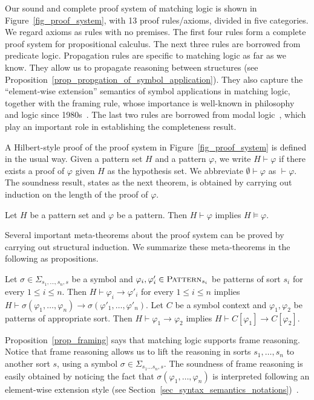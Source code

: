 \documentclass[acmsmall,review,anonymous]{acmart}
\newcommand{\imp}{\to}
\newcommand{\Pattern}{\textnormal{\textsc{Pattern}}}
\newcommand{\ddd}{,\dots,}
\newcommand{\SigmaSub}[1]{\Sigma_{#1}}
\begin{document}
Our sound and complete proof system of matching logic
is shown in Figure~\ref{fig_proof_system},
with 13 proof rules/axioms, divided in five categories.
We regard axioms as rules with no premises.
The first four rules form a complete proof system for propositional calculus.
The next three rules are borrowed from predicate logic.
Propagation rules are specific to matching logic as far as we know.
They allow us to propagate reasoning between structures 
(see Proposition~\ref{prop_propgation_of_symbol_application}).
They also capture
the ``element-wise extension'' semantics of symbol applications
in matching logic,
together with the framing rule,
whose importance is well-known in philosophy and logic since 1980s~\cite{bibid}.
The last two rules are borrowed from modal logic~\cite{bibid},
which play an important role in establishing the completeness result.

A Hilbert-style proof of the proof system in Figure~\ref{fig_proof_system}
is defined in the usual way.
Given a pattern set $H$ and a pattern $\varphi$,
we write $H \vdash \varphi$ if
there exists a proof of $\varphi$ 
given $H$ as the hypothesis set.
We abbreviate $\emptyset \vdash \varphi$ as $\vdash \varphi$.
The soundness result,
states as the next theorem,
is obtained by carrying out induction on the length of the proof of $\varphi$.
\begin{theorem}[Soundness]
Let $H$ be a pattern set and $\varphi$ be a pattern.
Then $H \vdash \varphi$ implies $H \vDash \varphi$.
\end{theorem}

Several important meta-theorems about the proof system
can be proved by carrying out structural induction.
We summarize these meta-theorems in the following as propositions.

\begin{proposition}
\label{prop_framing}
Let $\sigma \in \SigmaSub{s_1 \ddd s_n , s}$ be a symbol
and $\varphi_i, \varphi'_i \in \Pattern_{s_i}$ be patterns
of sort $s_i$ for every $1 \le i \le n$.
Then $H \vdash \varphi_i \imp \varphi'_i$ for every $1 \le i \le n$
implies $H \vdash 
\sigma(\varphi_1 \ddd \varphi_n) \imp
\sigma(\varphi'_1 \ddd \varphi'_n)$.
Let $C$ be a symbol context and $\varphi_1,\varphi_2$ be patterns of appropriate sort.
Then $H \vdash \varphi_1 \imp \varphi_2$
implies $H \vdash C[\varphi_1] \imp C[\varphi_2]$.
\end{proposition}
Proposition~\ref{prop_framing} says that matching logic
supports frame reasoning.
Notice that frame reasoning allows us to lift 
the reasoning in sorts $s_1 \ddd s_n$
to another sort $s$, using a symbol $\sigma \in \Sigma_{s_1 \dots s_n,s}$.
The soundness of frame reasoning is easily obtained
by noticing the fact that $\sigma(\varphi_1 \ddd \varphi_n)$ is interpreted
following an element-wise extension style
(see Section~\ref{sec_syntax_semantics_notations})~\cite{bibid}.
\end{document}
